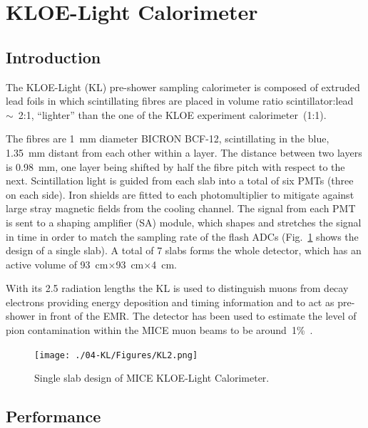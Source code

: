 \graphicspath{{04-KL/Figures/}}

\section{KLOE-Light Calorimeter}
\label{Sect:KL}

\subsection{Introduction}
\label{SubSect:KL_Intro}

The KLOE-Light (KL) pre-shower sampling calorimeter is composed of extruded lead foils in which scintillating
fibres are placed in volume ratio scintillator:lead~$\sim$~2:1, ``lighter'' than the one of the KLOE experiment calorimeter~(1:1).

The fibres are 1~mm diameter BICRON BCF-12, scintillating in the blue, 1.35~mm distant from each other within a layer. The distance between two layers is 0.98~mm, one layer being shifted by half the fibre pitch with respect to the next.
Scintillation light is guided from each slab into a total of six PMTs (three on each side). Iron shields are fitted to each photomultiplier to
mitigate against large stray magnetic fields from the cooling channel. The signal from each PMT is sent to a shaping amplifier (SA) module, which shapes and stretches the signal in time in order to match the sampling rate of the flash ADCs (Fig.~\ref{fig:KL2} shows the design of a single slab).
A total of 7 slabs forms the whole detector, which has an active volume of 93~cm$\times$93~cm$\times$4~cm.

With its 2.5 radiation lengths the KL is used to distinguish muons from decay electrons providing energy deposition and timing information and to act as pre-shower in front of the EMR.
The detector has been used to estimate the level of pion contamination within the MICE muon beams to be around~1\%~\cite{2016JInst..11P3001A}.
\begin{figure}
  \begin{center}
    \texttt{[image: ./04-KL/Figures/KL2.png]}
    \caption{Single slab design of MICE KLOE-Light Calorimeter.}
    \label{fig:KL2}
  \end{center}
\end{figure}



\subsection{Performance}
\label{SubSect:KL_Performance}

